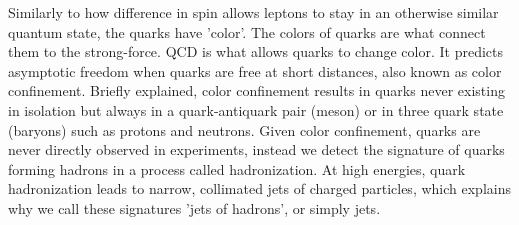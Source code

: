 Similarly to how difference in spin allows leptons to stay in an otherwise similar quantum state, the quarks have 'color'.
The colors of quarks are what connect them to the strong-force. \ac{QCD} is what allows quarks to change color. 
It predicts asymptotic freedom when quarks are free at short distances, also known as
color confinement. Briefly explained, color confinement results in quarks never existing
in isolation but always in a quark-antiquark pair (meson) or in three quark state (baryons) such as protons and neutrons. Given 
color confinement, quarks are never directly observed in experiments, instead we detect the signature of quarks forming hadrons in a 
process called hadronization. At high energies, quark hadronization leads to narrow, collimated jets of charged particles, which explains why we call 
these signatures 'jets of hadrons', or simply jets. 
